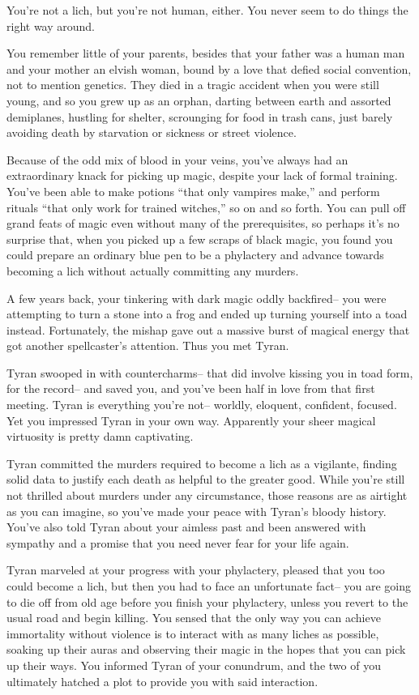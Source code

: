 \documentclass[char]{Sel}
\begin{document}
\name{\cCarminis{}}
You're not a lich, but you're not human, either. You never seem to do things the right way around.

You remember little of your parents, besides that your father was a human man and your mother an elvish woman, bound by a love that defied social convention, not to mention genetics. They died in a tragic accident when you were still young, and so you grew up as an orphan, darting between earth and assorted demiplanes, hustling for shelter, scrounging for food in trash cans, just barely avoiding death by starvation or sickness or street violence.

Because of the odd mix of blood in your veins, you've always had an extraordinary knack for picking up magic, despite your lack of formal training. You've been able to make potions ``that only vampires make,'' and perform rituals ``that only work for trained witches,'' so on and so forth. You can pull off grand feats of magic even without many of the prerequisites, so perhaps it's no surprise that, when you picked up a few scraps of black magic, you found you could prepare an ordinary blue pen to be a phylactery and advance towards becoming a lich without actually committing any murders.

A few years back, your tinkering with dark magic oddly backfired-- you were attempting to turn a stone into a frog and ended up turning yourself into a toad instead. Fortunately, the mishap gave out a massive burst of magical energy that got another spellcaster's attention. Thus you met Tyran.

Tyran swooped in with countercharms-- that did involve kissing you in toad form, for the record-- and saved you, and you've been half in love from that first meeting. Tyran is everything you're not-- worldly, eloquent, confident, focused. Yet you impressed Tyran in your own way. Apparently your sheer magical virtuosity is pretty damn captivating.

Tyran committed the murders required to become a lich as a vigilante, finding solid data to justify each death as helpful to the greater good. While you're still not thrilled about murders under any circumstance, those reasons are as airtight as you can imagine, so you've made your peace with Tyran's bloody history. You've also told Tyran about your aimless past and been answered with sympathy and a promise that you need never fear for your life again.

Tyran marveled at your progress with your phylactery, pleased that you too could become a lich, but then you had to face an unfortunate fact-- you are going to die off from old age before you finish your phylactery, unless you revert to the usual road and begin killing. You sensed that the only way you can achieve immortality without violence is to interact with as many liches as possible, soaking up their auras and observing their magic in the hopes that you can pick up their ways. You informed Tyran of your conundrum, and the two of you ultimately hatched a plot to provide you with said interaction.
\end{document}
